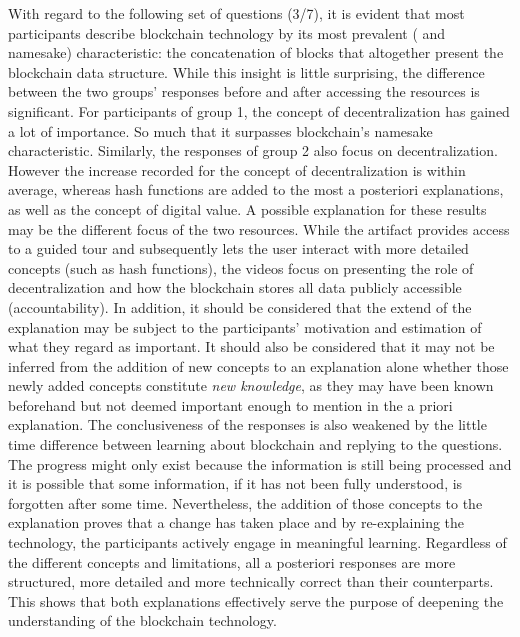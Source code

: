 With regard to the following set of questions (3/7), it is evident that most participants describe blockchain technology by its most prevalent ( and namesake) characteristic: the concatenation of blocks that altogether present the blockchain data structure. While this insight is little surprising, the difference between the two groups' responses before and after accessing the resources is significant. For participants of group 1, the concept of decentralization has gained a lot of importance. So much that it surpasses blockchain's namesake characteristic. Similarly, the responses of group 2 also focus on decentralization. However the increase recorded for the concept of decentralization is within average, whereas hash functions are added to the most a posteriori explanations, as well as the concept of digital value. A possible explanation for these results may be the different focus of the two resources. While the artifact provides access to a guided tour and subsequently lets the user interact with more detailed concepts (such as hash functions), the videos focus on presenting the role of decentralization and how the blockchain stores all data publicly accessible (accountability). In addition, it should be considered that the extend of the explanation may be subject to the participants' motivation and estimation of what they regard as important. It should also be considered that it may not be inferred from the addition of new concepts to an explanation alone whether those newly added concepts constitute \textit{new knowledge}, as they may have been known beforehand but not deemed important enough to mention in the a priori explanation. The conclusiveness of the responses is also weakened by the little time difference between learning about blockchain and replying to the questions. The progress might only exist because the information is still being processed and it is possible that some information, if it has not been fully understood, is forgotten after some time. Nevertheless, the addition of those concepts to the explanation proves that a change has taken place and by re-explaining the technology, the participants actively engage in meaningful learning. Regardless of the different concepts and limitations, all a posteriori responses are more structured, more detailed and more technically correct than their counterparts. This shows that both explanations effectively serve the purpose of deepening the understanding of the blockchain technology. 

